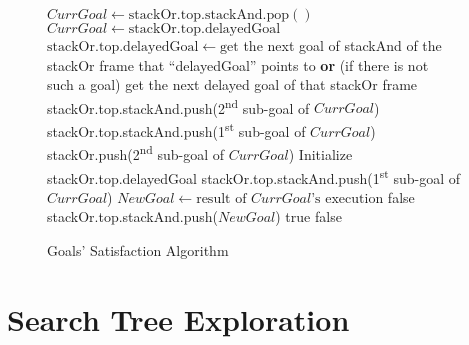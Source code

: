 \documentclass{ws-ijait}
\begin{document}
\begin{figure}
  \centering
  \begin{algorithmic}
          \State $CurrGoal \gets
                  \mathrm{stackOr.top.stackAnd.pop()}$
        \Else
          \State $CurrGoal \gets
                  \mathrm{stackOr.top.delayedGoal}$
          \State $\mathrm{stackOr.top.delayedGoal} \gets
                 \textrm{get}$ the next goal of stackAnd of
                 the \\ \hspace{8em} stackOr frame that
                 ``delayedGoal'' points to \textbf{or} (if
                 there is not \\ \hspace{8em} such a goal)
                 get the next delayed goal of that stackOr
                 frame
        \EndIf
          \State stackOr.top.stackAnd.push(2\textsuperscript{nd}
                 sub-goal of $CurrGoal$)
          \State stackOr.top.stackAnd.push(1\textsuperscript{st}
                 sub-goal of $CurrGoal$)
          \State stackOr.push(2\textsuperscript{nd} sub-goal
                 of $CurrGoal$)
          \State Initialize stackOr.top.delayedGoal
          \State stackOr.top.stackAnd.push(1\textsuperscript{st}
                 sub-goal of $CurrGoal$)
        \Else
          \State $NewGoal \gets \textrm{result
                  of }CurrGoal\textrm{'s execution}$
              \State \Return false
            \EndIf
          \EndIf
            \State stackOr.top.stackAnd.push($NewGoal$)
            \State \Return true 
          \EndIf
        \EndIf
      \EndWhile
      \State \Return false
    \EndFunction
  \end{algorithmic}
  \caption{Goals' Satisfaction Algorithm\label{search}}
\end{figure}


\section{Search Tree Exploration}
\end{document}
